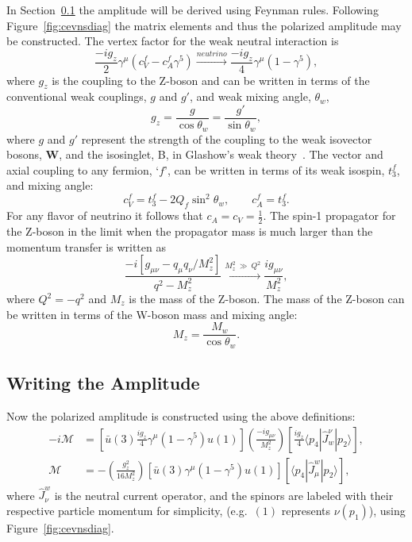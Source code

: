In Section~\ref{sec:amplitude} the amplitude will be derived using Feynman rules. Following Figure~\ref{fig:cevnsdiag} the matrix elements and thus the polarized amplitude may be constructed. The vertex factor for the weak neutral interaction is
\begin{equation}
\frac{-ig_{z}}{2}\gamma ^{\mu}(c_{V}^{f}-c_{A}^{f}\gamma ^{5}) \xrightarrow{neutrino} \frac{-ig_z}{4}\gamma ^{\mu}(1-\gamma ^{5}), \label{eq:vertex} 
\end{equation}
where $g_z$ is the coupling to the Z-boson and can be written in terms of the conventional weak couplings, $g$ and $g'$, and weak mixing angle, $\theta _w$,
\begin{equation}\label{eq:zcoupling}
g_z = \frac{g}{\cos \theta _w}=\frac{g'}{\sin \theta _w},
\end{equation}
where $g$ and $g'$ represent the strength of the coupling to the weak isovector bosons, $\mathbf{W}$, and the isosinglet, B, in Glashow's weak theory~\cite{griffiths:2004:introduction}. The vector and axial coupling to any fermion, `$f$', can be written in terms of its weak isospin, $t_3^f$, and mixing angle:
\begin{equation}
c_V^f=t_3^f-2Q_f\sin ^2 \theta _w,\qquad c_A^f=t_3^f.
\end{equation}
For any flavor of neutrino it follows that $c_{A}=c_{V}=\frac{1}{2}$. The spin-1 propagator for the Z-boson in the limit when the propagator mass is much larger than the momentum transfer is written as
\begin{equation}
\frac{-i[g_{\mu \nu}-q_{\mu}q_{\nu}/M_{z}^{2}]}{q^2-M_{z}^{2}}\xrightarrow{M_{z}^2\ \gg \ Q^2} \frac{i g_{\mu \nu}}{M_z^2},\label{eq:propagator}
\end{equation}
where $Q^2=- q^2$ and $M_z$ is the mass of the Z-boson. The mass of the Z-boson can be written in terms of the W-boson mass and mixing angle:
\begin{equation}\label{eq:zmass}
M_z = \frac{M_w}{\cos \theta _w}.
\end{equation}

\subsection{Writing the Amplitude}
\label{sec:amplitude}
Now the polarized amplitude is constructed using the above definitions:%
\begin{align}
-i\mathcal{M} &= \left[ \bar{u}(3)\frac{ig_{z}}{4}\gamma ^{\mu}(1-\gamma ^{5})u(1)\right] \left( \frac{-ig_{\mu \nu }}{M_{z}^{2}}\right) \left[ \frac{ig_{z}}{4}\langle p_4|\hat{J}^{\nu}_{w}|p_2 \rangle \right], \nonumber \\
\mathcal{M} &= -\left( \frac{g_{z}^{2}}{16 M_{z}^{2}}\right) [\bar{u}(3)\gamma ^{\mu}(1-\gamma ^{5})u(1)][\langle p_4|\hat{J}_{\mu}^{w}|p_2 \rangle],
\label{eq:unpolarized}
\end{align} 
where $\hat{J}_{\nu}^{w}$ is the neutral current operator, and the spinors are labeled with their respective particle momentum for simplicity, (e.g.\ $(1)$ represents $\nu (p_1)$), using Figure~\ref{fig:cevnsdiag}. 

